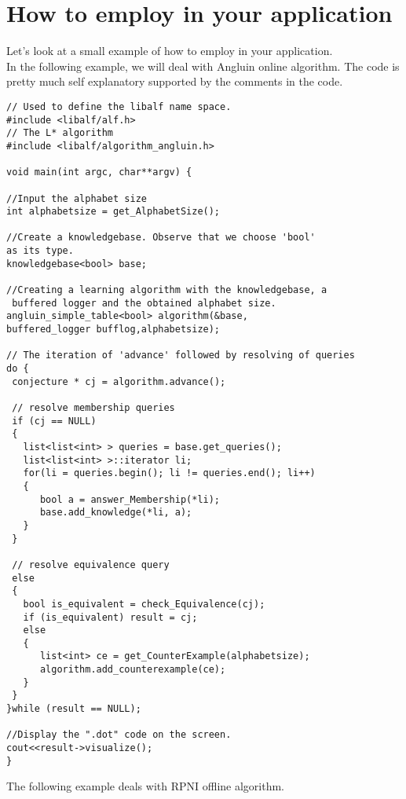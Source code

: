 \section{How to employ \libalf in your application}
Let's look at a small example of how to employ \libalf in your application. \\
In the following \cpp example, we will deal with Angluin online algorithm. The code is pretty much self explanatory supported by the comments in the code.
\lstset{language=c++, numbers=left, numberstyle=\tiny, stepnumber=1, numbersep=5pt}
\begin{lstlisting}[frame=single]
// Used to define the libalf name space.
#include <libalf/alf.h>
// The L* algorithm
#include <libalf/algorithm_angluin.h>

void main(int argc, char**argv) {

//Input the alphabet size
int alphabetsize = get_AlphabetSize();

//Create a knowledgebase. Observe that we choose 'bool' 
as its type.
knowledgebase<bool> base;

//Creating a learning algorithm with the knowledgebase, a
 buffered logger and the obtained alphabet size.
angluin_simple_table<bool> algorithm(&base,
buffered_logger bufflog,alphabetsize);

// The iteration of 'advance' followed by resolving of queries
do {
 conjecture * cj = algorithm.advance();

 // resolve membership queries
 if (cj == NULL) 
 {
   list<list<int> > queries = base.get_queries();
   list<list<int> >::iterator li;
   for(li = queries.begin(); li != queries.end(); li++) 
   {
      bool a = answer_Membership(*li);
      base.add_knowledge(*li, a);
   }
 }

 // resolve equivalence query
 else 
 {
   bool is_equivalent = check_Equivalence(cj);
   if (is_equivalent) result = cj; 
   else 
   {	
      list<int> ce = get_CounterExample(alphabetsize);
      algorithm.add_counterexample(ce);
   }
 }
}while (result == NULL);

//Display the ".dot" code on the screen.
cout<<result->visualize();
}
\end{lstlisting}

The following \java example deals with RPNI offline algorithm.

